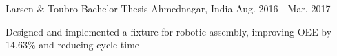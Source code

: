\begin{cventries}
  \cventry
    {Larsen \& Toubro} %
    {Bachelor Thesis} %
    {Ahmednagar, India} %
    {Aug. 2016 - Mar. 2017} %
    {
      \begin{cvitems} %
        \item {Designed and implemented a fixture for robotic assembly, improving OEE by 14.63\% and reducing cycle time}
      \end{cvitems}
    }


\end{cventries}
